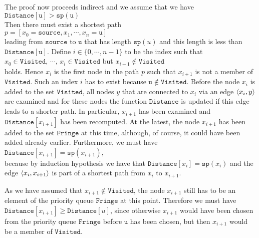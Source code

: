 \begin{enumerate}
      The proof now proceeds indirect and we assume that we have
      \\[0.2cm]
      \hspace*{1.3cm} $\mathtt{Distance}[\mathtt{u}] > \mathtt{sp}(\mathtt{u})$
      \\[0.2cm]
      Then there must exist a shortest path 
      \\[0.2cm]
      \hspace*{1.3cm} $p = [ x_0 = \mathtt{source}, x_1, \cdots, x_n = \mathtt{u} ]$
      \\[0.2cm]
      leading from $\mathtt{source}$ to $\mathtt{u}$ that has length $\mathtt{sp}(u)$ and this length is less
      than $\mathtt{Distance}[\mathtt{u}]$.  Define  $i\in\{0,\cdots,n-1\}$ to be the index such that
      \\[0.2cm]
      \hspace*{1.3cm}
      $x_0\in \mathtt{Visited}$, $\cdots$, $x_i\in \mathtt{Visited}$ \quad but \quad $x_{i+1} \not\in \mathtt{Visited}$
      \\[0.2cm]
      holds.  Hence $x_i$ is the first node in the path  $p$ such that $x_{i+1}$ is not a member of
      $\mathtt{Visited}$.  Such an index $i$ has to exist because $\mathtt{u} \not\in \mathtt{Visited}$.
      Before the node $x_i$ is added to the set $\mathtt{Visited}$, all nodes $y$ that are connected
      to $x_i$ via an edge $\pair(x_i, y)$ are examined and for these nodes the function
      $\mathtt{Distance}$ is updated if this edge leads to a shorter path.  In particular, $x_{i+1}$ has
      been examined and $\mathtt{Distance}[x_{i+1}]$ has been recomputed.  At the latest, the node
      $x_{i+1}$ has been added to the set  $\mathtt{Fringe}$ at this time, although, of course, it
      could have been added already earlier.  Furthermore, we must have
      \\[0.2cm]
      \hspace*{1.3cm}
      $\mathtt{Distance}[x_{i+1}] = \mathtt{sp}(x_{i+1})$,
      \\[0.2cm]
      because by induction hypothesis we have that $\mathtt{Distance}[x_i] = \mathtt{sp}(x_i)$ and 
      the edge $\pair(x_i,x_{i+1})$ is part of a shortest path from  $x_i$ to $x_{i+1}$.
      
      As we have assumed that $x_{i+1} \not\in \mathtt{Visited}$, the node $x_{i+1}$ still has to be an
      element of the priority queue $\mathtt{Fringe}$ at this point.  Therefore we must have
      $\mathtt{Distance}[x_{i+1}] \geq \mathtt{Distance}[u]$, since otherwise  $x_{i+1}$ would have been
      chosen from the priority queue $\mathtt{Fringe}$ before $\mathtt{u}$ has been chosen, but then $x_{i+1}$
      would be a member of $\mathtt{Visited}$.


\end{enumerate}
